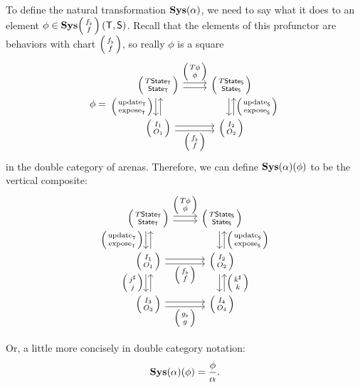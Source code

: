 \documentclass[DynamicalBook]{subfiles}
\begin{document}
To define the natural transformation $\textbf{Sys}(\alpha)$, we need to say what it
does to an element $\phi \in \Cat{Sys}\lens{f_{\flat}}{f}\left(\Sys{T},
  \Sys{S}\right)$. Recall that the elements of this profunctor are behaviors with
  chart $\lens{f_{\flat}}{f}$, so really $\phi$ is a square
\[
  \phi =
    \begin{tikzcd}
      \lens{T\State{T}}{\State{T}} \ar[r, shift left, "\lens{T\phi}{\phi}"] \ar[r, shift right] \ar[d, shift right,
      "\lens{\update{T}}{\expose{T}}"'] \ar[d, shift left, leftarrow] &
      \lens{T\State{S}}{\State{S}} \ar[d, shift left, leftarrow,
      "\lens{\update{S}}{\expose{S}}"] \ar[d, shift right]\\
      \lens{I_1}{O_1} \ar[r, shift right, "\lens{f_{\flat}}{f}"'] \ar[r,
      shift left] & \lens{I_2}{O_2}
    \end{tikzcd}
\]
in the double category of arenas. Therefore, we can define
$\textbf{Sys}(\alpha)(\phi)$ to be the vertical composite:
\[
  \begin{tikzcd}
    \lens{T\State{T}}{\State{T}} \ar[r, shift left, "\lens{T\phi}{\phi}"] \ar[r, shift right] \ar[d, shift right,
    "\lens{\update{T}}{\expose{T}}"'] \ar[d, shift left, leftarrow] &
    \lens{T\State{S}}{\State{S}} \ar[d, shift left, leftarrow,
    "\lens{\update{S}}{\expose{S}}"] \ar[d, shift right]\\
    \lens{I_1}{O_1} \ar[d, shift right, "\lens{j^{\sharp}}{j}"'] \ar[d, shift left,
        leftarrow] \ar[r, shift right, "\lens{f_{\flat}}{f}"']
    \ar[r, shift left] & \lens{I_2}{O_2} \ar[d, shift left, leftarrow,
        "\lens{k^{\sharp}}{k}"] \ar[d, shift right]\\
    \lens{I_3}{O_3} \ar[r, shift right, "\lens{g_{\flat}}{g}"']
    \ar[r, shift left] & \lens{I_4}{O_4} \\
  \end{tikzcd}
\]
Or, a little more concisely in double category notation:
$$\textbf{Sys}(\alpha)(\phi) = \frac{\phi}{\alpha}.$$
\end{document}
